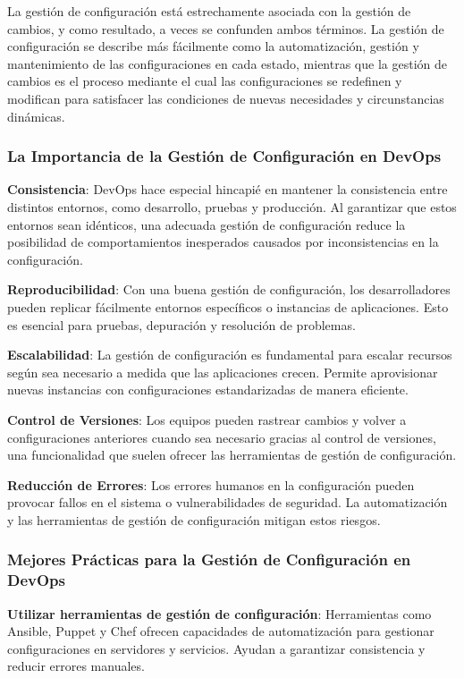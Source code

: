 \documentclass[12pt]{book}
\begin{document}
La gestión de configuración está estrechamente asociada con la gestión de cambios, y como resultado, a veces se confunden ambos términos. La gestión de configuración se describe más fácilmente como la automatización, gestión y mantenimiento de las configuraciones en cada estado, mientras que la gestión de cambios es el proceso mediante el cual las configuraciones se redefinen y modifican para satisfacer las condiciones de nuevas necesidades y circunstancias dinámicas.


\subsubsection*{La Importancia de la Gestión de Configuración en DevOps}

\textbf{Consistencia}: DevOps hace especial hincapié en mantener la consistencia entre distintos entornos, como desarrollo, pruebas y producción. Al garantizar que estos entornos sean idénticos, una adecuada gestión de configuración reduce la posibilidad de comportamientos inesperados causados por inconsistencias en la configuración.

\textbf{Reproducibilidad}: Con una buena gestión de configuración, los desarrolladores pueden replicar fácilmente entornos específicos o instancias de aplicaciones. Esto es esencial para pruebas, depuración y resolución de problemas.

\textbf{Escalabilidad}: La gestión de configuración es fundamental para escalar recursos según sea necesario a medida que las aplicaciones crecen. Permite aprovisionar nuevas instancias con configuraciones estandarizadas de manera eficiente.

\textbf{Control de Versiones}: Los equipos pueden rastrear cambios y volver a configuraciones anteriores cuando sea necesario gracias al control de versiones, una funcionalidad que suelen ofrecer las herramientas de gestión de configuración.

\textbf{Reducción de Errores}: Los errores humanos en la configuración pueden provocar fallos en el sistema o vulnerabilidades de seguridad. La automatización y las herramientas de gestión de configuración mitigan estos riesgos.

\subsubsection*{Mejores Prácticas para la Gestión de Configuración en DevOps}

\textbf{Utilizar herramientas de gestión de configuración}: Herramientas como Ansible, Puppet y Chef ofrecen capacidades de automatización para gestionar configuraciones en servidores y servicios. Ayudan a garantizar consistencia y reducir errores manuales.
\end{document}
